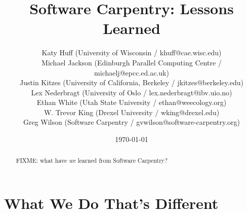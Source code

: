 \documentclass{article}
\begin{document}
\title{Software Carpentry: Lessons Learned}
\date{\today}

\author{
  Katy Huff (University of  Wisconsin / khuff@cae.wisc.edu)\\
  Michael Jackson (Edinburgh Parallel Computing Centre / michaelj@epcc.ed.ac.uk)\\
  Justin Kitzes (University of California, Berkeley / jkitzes@berkeley.edu)\\
  Lex Nederbragt (University of Oslo / lex.nederbragt@ibv.uio.no)\\
  Ethan White (Utah State University / ethan@weecology.org)\\
  W. Trevor King (Drexel University / wking@drexel.edu)\\
  Greg Wilson (Software Carpentry / gvwilson@software-carpentry.org)
}

\maketitle

\begin{abstract}
FIXME: what have \emph{we} learned from Software Carpentry?
\end{abstract}

\section{What We Do That's Different}
\end{document}
